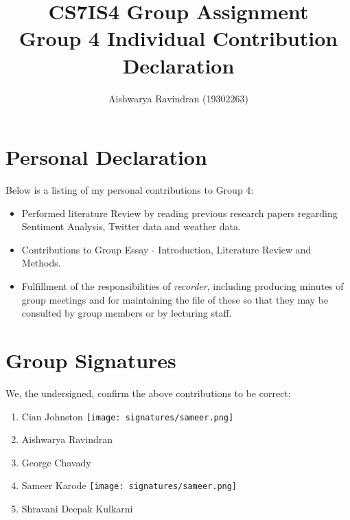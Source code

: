 \documentclass[a4paper,10pt]{article}
\begin{document}
\title{
    CS7IS4 Group Assignment \\
    \large Group 4 Individual Contribution Declaration
}
\author{
    Aishwarya Ravindran (19302263)
}

\maketitle

\section{Personal Declaration}

Below is a listing of my personal contributions to Group 4:

\begin{itemize}
    \item{
        Performed literature Review by reading previous research papers regarding Sentiment Analysis, Twitter data and weather data.
    }
    
    \item{
        Contributions to Group Essay - Introduction, Literature Review and Methods.
    }
    \item{
        Fulfillment of the responsibilities of \textit{recorder}, including producing minutes of group meetings and for maintaining the file of these so that they may be consulted by group members or by lecturing staff. 
    }
\end{itemize}

\section{Group Signatures}

We, the undersigned, confirm the above contributions to be correct:

\begin{enumerate}
    \item{
        Cian Johnston \texttt{[image: signatures/sameer.png]}
    }
    \item{
        Aishwarya Ravindran
    }
    \item{
        George Chavady
    }
    \item{
        Sameer Karode \texttt{[image: signatures/sameer.png]}
    }
    \item{
        Shravani Deepak Kulkarni
    }

\end{enumerate}
\end{document}
